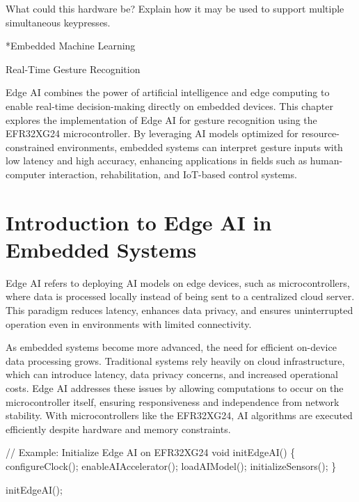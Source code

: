 \documentclass[
  9pt,
  letterpaper,
  abstract,
  titlepage]{scrbook}
\makeatletter
\newenvironment{Shaded}{\begin{snugshade}}{\end{snugshade}}
\newcommand{\CommentTok}[1]{\textcolor[rgb]{0.37,0.37,0.37}{#1}}
\newcommand{\DataTypeTok}[1]{\textcolor[rgb]{0.68,0.00,0.00}{#1}}
\newcommand{\NormalTok}[1]{\textcolor[rgb]{0.00,0.23,0.31}{#1}}
\newcommand{\OperatorTok}[1]{\textcolor[rgb]{0.37,0.37,0.37}{#1}}
\renewcommand\chapter{\clearpage\global\@topnum\z@
\@afterindentfalse \secdef\@chapter\@schapter}
\renewcommand{\part}[1]{%
    \chapter*{#1} %
    \addcontentsline{toc}{part}{#1} %
}
\newif\if@firstnumbered%
\newif\if@firstunnumbered%
\newcounter{lastRomanPage}
\let\old@chapter\chapter%
\renewcommand{\chapter}{%
  \@ifstar{\unnumbered@chapter}{\numbered@chapter}%
}
\newcommand{\numbered@chapter}[1]{%
  \if@firstnumbered%
    \cleardoublepage%
    \setcounter{lastRomanPage}{\value{page}}%
    \pagenumbering{arabic}%
    \@firstnumberedfalse%
  \else
    \setcounter{page}{\value{page}}%
  \fi
  \old@chapter{#1}%
}
\newcommand{\unnumbered@chapter}[1]{%
  \if@firstunnumbered%
    \clearpage
    \setcounter{lastRomanPage}{\value{page}}%
    \pagenumbering{roman}%
    \@firstunnumberedfalse%
  \fi
  \old@chapter*{#1}%
}
\makeatother
\begin{document}
What could this hardware be? Explain how it may be used to support
multiple simultaneous keypresses.

\part{Embedded Machine Learning}

\chapter{Real-Time Gesture
Recognition}\label{real-time-gesture-recognition}

Edge AI combines the power of artificial intelligence and edge computing
to enable real-time decision-making directly on embedded devices. This
chapter explores the implementation of Edge AI for gesture recognition
using the EFR32XG24 microcontroller. By leveraging AI models optimized
for resource-constrained environments, embedded systems can interpret
gesture inputs with low latency and high accuracy, enhancing
applications in fields such as human-computer interaction,
rehabilitation, and IoT-based control systems.

\section{Introduction to Edge AI in Embedded
Systems}\label{introduction-to-edge-ai-in-embedded-systems}

Edge AI refers to deploying AI models on edge devices, such as
microcontrollers, where data is processed locally instead of being sent
to a centralized cloud server. This paradigm reduces latency, enhances
data privacy, and ensures uninterrupted operation even in environments
with limited connectivity.

As embedded systems become more advanced, the need for efficient
on-device data processing grows. Traditional systems rely heavily on
cloud infrastructure, which can introduce latency, data privacy
concerns, and increased operational costs. Edge AI addresses these
issues by allowing computations to occur on the microcontroller itself,
ensuring responsiveness and independence from network stability. With
microcontrollers like the EFR32XG24, AI algorithms are executed
efficiently despite hardware and memory constraints.

\begin{Shaded}
\begin{Highlighting}[]
\CommentTok{// Example: Initialize Edge AI on EFR32XG24}
\DataTypeTok{void}\NormalTok{ initEdgeAI}\OperatorTok{()} \OperatorTok{\{}
\NormalTok{    configureClock}\OperatorTok{();}
\NormalTok{    enableAIAccelerator}\OperatorTok{();}
\NormalTok{    loadAIModel}\OperatorTok{();}
\NormalTok{    initializeSensors}\OperatorTok{();}
\OperatorTok{\}}

\NormalTok{initEdgeAI}\OperatorTok{();}
\end{Highlighting}
\end{Shaded}
\end{document}
